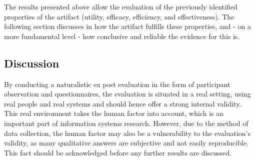 
The results presented above allow the evaluation of the previously identified properties of the artifact (utility, efficacy, efficiency, and effectiveness). The following section discusses in how the artifact fulfills these properties, and - on a more fundamental level - how conclusive and reliable the evidence for this is. 

\subsection{Discussion}
By conducting a naturalistic ex post  evaluation in the form of participant observation and questionnaires, the evaluation is situated in a real setting, using real people and real systems and should hence offer a strong internal validity. This real environment takes the human factor into account, which is an important part of information systems research. However, due to the method of data collection, the human factor may also be a vulnerability to the evaluation's validity, as many qualitative answers are subjective and not easily reproducible. This fact should be acknowledged before any further results are discussed.

